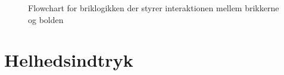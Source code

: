 \begin{center}
\begin{figure}
\begin{tikzpicture}



\end{tikzpicture}
\caption{Flowchart for briklogikken der styrer interaktionen mellem brikkerne og bolden}
\label{fig:brickFlow}
\end{figure}
\restoregeometry
\end{center}


		

\section{Helhedsindtryk}

